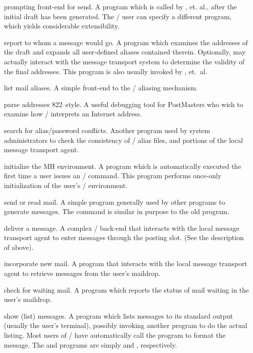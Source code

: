  prompting front-end for send.
A program which is called by  , et. al.,
after the initial draft has been generated.
The \MH/ user can specify a different  program,
which yields considerable extensibility.

 report to whom a message would go.
A program which examines the addresses of the draft and expands
all user-defined aliases contained therein.
Optionally,
 may actually interact with the message transport system
to determine the validity of the final addresses.
This program is also usually invoked by , et.~al.

 list mail aliases.
A simple front-end to the \MH/ aliasing mechanism.

 parse addresses 822--style.
A useful debugging tool for PostMasters who wish to examine how \MH/
interprets an Internet address.

 search for alias/password conflicts.
Another program used by system administrators to check the consistency of
\MH/ alias files, and portions of the local message transport agent.

 initialize the MH environment.
A program which is automatically executed the first time a user issues an
\MH/ command.
This program performs once-only initialization of the user's \MH/ environment.

 send or read mail.
A simple program generally used by other programs to generate messages.
The  command is similar in purpose to the old 
program.

 deliver a message.
A complex \MH/ back-end that interacts with the local message transport agent
to enter messages through the posting slot.
(See the description of  above).

 incorporate new mail.
A program that interacts with the local message transport agent
to retrieve messages from the user's maildrop.

 check for waiting mail.
A program which reports the status of mail waiting in the user's maildrop.

 show (list) messages.
A program which lists messages to its standard output
(usually the user's terminal),
possibly invoking another program to do the actual listing.
Most users of \MH/ have  automatically call the  program
to format the message.
The  and  programs are simply
 and ,
respectively.

